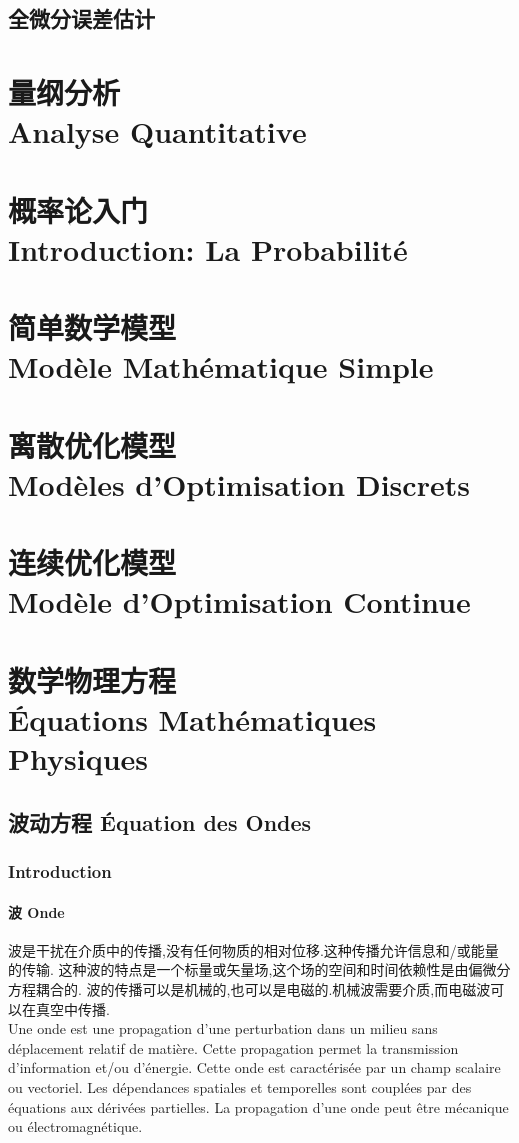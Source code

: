 \documentclass[12pt, a4paper, oneside]{ctexbook}
\begin{document}
  \section{全微分误差估计}
  \chapter{量纲分析\\ Analyse Quantitative}
  \chapter{概率论入门\\Introduction: La Probabilité}
  \chapter{简单数学模型\\ Modèle Mathématique Simple}  
  \chapter{离散优化模型\\ Modèles d'Optimisation Discrets} 
  \chapter{连续优化模型\\ Modèle d'Optimisation Continue} 

  
  \chapter{数学物理方程\\ Équations Mathématiques Physiques}%
  \section{波动方程 Équation des Ondes}
  \subsection{Introduction}
  \subsubsection{波 Onde}
  波是干扰在介质中的传播,没有任何物质的相对位移.这种传播允许信息和/或能量的传输.
  这种波的特点是一个标量或矢量场,这个场的空间和时间依赖性是由偏微分方程耦合的.
  波的传播可以是机械的,也可以是电磁的.机械波需要介质,而电磁波可以在真空中传播.
  \\
  \indent
  Une onde est une propagation d'une perturbation dans un milieu sans déplacement relatif de matière.
  Cette propagation permet la transmission d'information et/ou d'énergie.
  Cette onde est caractérisée par un champ scalaire ou vectoriel.
  Les dépendances spatiales et temporelles sont couplées par des équations aux dérivées partielles.
  La propagation d'une onde peut être mécanique ou électromagnétique.
\end{document}
